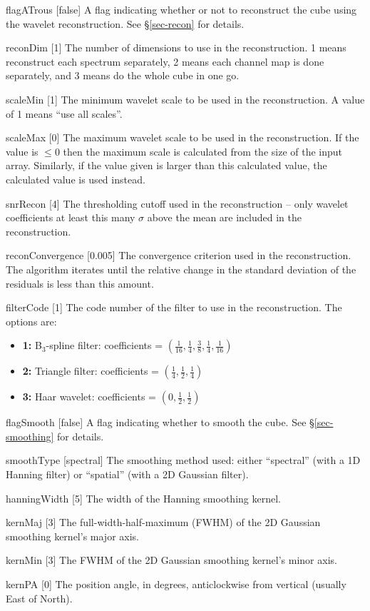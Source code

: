 \begin{Lentry}
\item[{flagATrous [false]}] A flag indicating whether or not to
  reconstruct the cube using the \atrous wavelet
  reconstruction. See \S\ref{sec-recon} for details.
\item[{reconDim [1]}] The number of dimensions to use in the
  reconstruction. 1 means reconstruct each spectrum separately, 2
  means each channel map is done separately, and 3 means do the whole
  cube in one go.
\item[{scaleMin [1]}] The minimum wavelet scale to be used in the
  reconstruction. A value of 1 means ``use all scales''.
\item[{scaleMax [0]}] The maximum wavelet scale to be used in the
  reconstruction. If the value is $\le0$ then the maximum scale is
  calculated from the size of the input array. Similarly, if the value
  given is larger than this calculated value, the calculated value is
  used instead.
\item[{snrRecon [4]}] The thresholding cutoff used in the
  reconstruction -- only wavelet coefficients at least this many $\sigma$ above
  the mean are included in the reconstruction. 
\item[{reconConvergence [0.005]}] The convergence criterion used in
  the reconstruction. The \atrous algorithm iterates until the
  relative change in the standard deviation of the residuals is less
  than this amount.
\item[{filterCode [1]}] The code number of the filter to use in
  the reconstruction. The options are:
  \begin{itemize}
  \item \textbf{1:} B$_3$-spline filter: coefficients = 
    $(\frac{1}{16}, \frac{1}{4}, \frac{3}{8}, \frac{1}{4}, \frac{1}{16})$
  \item \textbf{2:} Triangle filter: coefficients = 
    $(\frac{1}{4}, \frac{1}{2}, \frac{1}{4})$
  \item \textbf{3:} Haar wavelet: coefficients = 
    $(0, \frac{1}{2}, \frac{1}{2})$
  \end{itemize}
\end{Lentry}

\begin{Lentry}
\item[{flagSmooth [false]}] A flag indicating whether to
  smooth the cube. See \S\ref{sec-smoothing} for details. 
\item[{smoothType [spectral]}] The smoothing method used: either
  ``spectral'' (with a 1D Hanning filter) or ``spatial'' (with a 2D
  Gaussian filter).  
\item[{hanningWidth [5]}] The width of the Hanning smoothing
  kernel.
\item[{kernMaj [3]}] The full-width-half-maximum (FWHM) of the
  2D Gaussian smoothing kernel's major axis.
\item[{kernMin [3]}] The FWHM of the 2D Gaussian smoothing kernel's
  minor axis.
\item[{kernPA [0]}] The position angle, in degrees,
  anticlockwise from vertical (\ie usually East of North). 
\end{Lentry}

